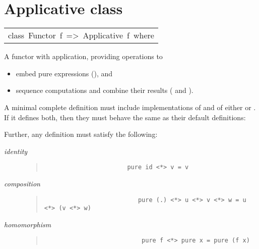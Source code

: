 \section{Applicative class
}
\begin{haddockdesc}
\item[\begin{tabular}{@{}l}
class\ Functor\ f\ =>\ Applicative\ f\ where
\end{tabular}]\haddockbegindoc
A functor with application, providing operations to\par
\begin{itemize}
\item
embed pure expressions (), and\par

\item
sequence computations and combine their results (\haddockid{<*>} and ).\par

\end{itemize}
A minimal complete definition must include implementations of 
 and of either \haddockid{<*>} or . If it defines both, then they must behave
 the same as their default definitions:\par
{}
      \par
Further, any definition must satisfy the following:\par
\begin{description}
\item[\emph{identity}] \begin{quote}
                       {\haddockverb\begin{verbatim}
                       pure id <*> v = v\end{verbatim}}
                       \end{quote}
                       
\item[\emph{composition}] \begin{quote}
                          {\haddockverb\begin{verbatim}
                          pure (.) <*> u <*> v <*> w = u <*> (v <*> w)\end{verbatim}}
                          \end{quote}
                          
\item[\emph{homomorphism}] \begin{quote}
                           {\haddockverb\begin{verbatim}
                           pure f <*> pure x = pure (f x)\end{verbatim}}
                           \end{quote}
                           

\end{description}
\end{haddockdesc}
